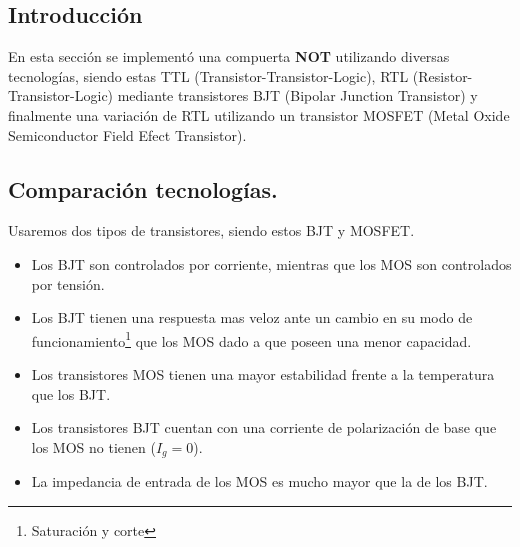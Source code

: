 %
%
%
%
%
%
%
%
%
%
%
%
%

\subsection{Introducción}
En esta sección se implementó una compuerta \textbf{NOT} utilizando diversas tecnologías, siendo estas TTL (Transistor-Transistor-Logic), RTL (Resistor-Transistor-Logic) mediante transistores BJT (Bipolar Junction Transistor) y finalmente una variación de RTL utilizando un transistor MOSFET (Metal Oxide Semiconductor Field Efect Transistor).
\subsection{Comparación tecnologías.}
Usaremos dos tipos de transistores, siendo estos BJT y MOSFET.
\begin{itemize}
\item Los BJT son controlados por corriente, mientras que los MOS son controlados por tensión.
\item Los BJT tienen una respuesta mas veloz ante un cambio en su modo de funcionamiento\footnote{Saturación y corte} que los MOS dado a que poseen una menor capacidad.
\item Los transistores MOS tienen una mayor estabilidad frente a la temperatura que los BJT.	
\item Los transistores BJT cuentan con una corriente de polarización de base que los MOS no tienen ($I_g =0$).
\item La impedancia de entrada de los MOS es mucho mayor que la de los BJT.
\end{itemize}


